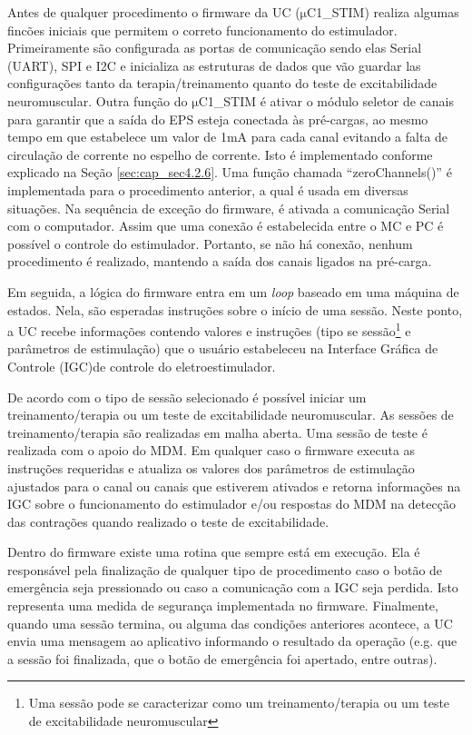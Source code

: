 Antes de qualquer procedimento o firmware da \acrshort{UC} ($\mathrm{\mu}$C1\_STIM) realiza algumas fincões iniciais que permitem o correto funcionamento do estimulador. Primeiramente são configurada as portas de comunicação sendo elas Serial (\acrshort{UART}), \acrshort{SPI} e \acrshort{I2C} e inicializa as estruturas de dados que vão guardar las configurações tanto da terapia/treinamento quanto do teste de excitabilidade neuromuscular.  Outra função do $\mathrm{\mu}$C1\_STIM é ativar o módulo seletor de canais para garantir que a saída do \acrshort{EPS} esteja conectada às pré-cargas, ao mesmo tempo em que estabelece um valor de 1mA para cada canal evitando a falta de circulação de corrente no espelho de corrente. Isto é implementado conforme explicado na Seção \ref{sec:cap_sec4.2.6}. Uma função chamada “zeroChannels()” é implementada para o procedimento anterior, a qual é usada em diversas situações. Na sequência de exceção do firmware, é ativada a comunicação Serial com o computador. Assim que uma conexão é estabelecida entre o \acrshort{MC} e \acrshort{PC} é possível o controle do estimulador. Portanto, se não há conexão, nenhum procedimento é realizado, mantendo a saída dos canais ligados na pré-carga.

Em seguida, a lógica do firmware entra em um \textit{loop} baseado em uma máquina de estados. Nela, são esperadas instruções sobre o início de uma sessão. Neste ponto, a \acrshort{UC} recebe informações contendo valores e instruções (tipo se sessão\footnote{Uma sessão pode se caracterizar como um treinamento/terapia ou um teste de excitabilidade neuromuscular} e parâmetros de estimulação) que o usuário estabeleceu na Interface Gráfica de Controle (\acrshort{IGC})de controle do eletroestimulador.

De acordo com o tipo de sessão selecionado é possível iniciar um treinamento/terapia ou um teste de excitabilidade neuromuscular. As sessões de treinamento/terapia são realizadas em malha aberta. Uma sessão de teste é realizada com o apoio do \acrshort{MDM}. Em qualquer caso o firmware executa as instruções requeridas e atualiza os valores dos parâmetros de estimulação ajustados para o canal ou canais que estiverem ativados e retorna informações na \acrshort{IGC} sobre o funcionamento do estimulador e/ou respostas do \acrshort{MDM} na detecção das contrações quando realizado o teste de excitabilidade.

Dentro do firmware existe uma rotina que sempre está em execução. Ela é responsável pela finalização de qualquer tipo de procedimento caso o botão de emergência seja pressionado ou caso a comunicação com a \acrshort{IGC} seja perdida. Isto representa uma medida de segurança implementada no firmware. Finalmente, quando uma sessão termina, ou alguma das condições anteriores acontece, a \acrshort{UC}  envia uma mensagem ao aplicativo informando o resultado da operação (e.g. que a sessão foi finalizada, que o botão de emergência foi apertado, entre outras).

